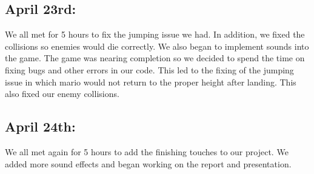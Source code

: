\documentclass[letterpaper]{article}
\begin{document}
\subsection*{April 23rd:}
We all met for 5 hours to fix the jumping issue we had.  In addition, we fixed the collisions so enemies would die correctly.  We also began to implement sounds into the game.  The game was nearing completion so we decided to spend the time on fixing bugs and other errors in our code.  This led to the fixing of the jumping issue in which mario would not return to the proper height after landing.  This also fixed our enemy collisions.

\subsection*{April 24th:}
We all met again for 5 hours to add the finishing touches to our project.  We added more sound effects and began working on the report and presentation.
\end{document}
